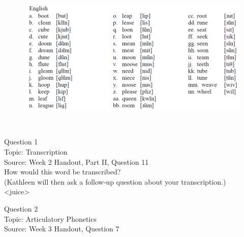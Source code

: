 \documentclass[12pt]{article}
\begin{document}
\begin{figure}[H]
\includegraphics{../images/english12.png}
\end{figure}

\newpage

\begin{center}
\textbf{{\color{red}{\HUGE END OF EXAM}}}\\

\end{center}
\newpage

\begin{center}
\textbf{{\color{blue}{\HUGE START OF EXAM\\}}}

\textbf{{\color{blue}{\HUGE Student ID: 34812\\}}}

\textbf{{\color{blue}{\HUGE \\}}}

\end{center}
\newpage

{\large Question 1}\\

Topic: Transcription\\
Source: Week 2 Handout, Part II, Question 11\\

How would this word be transcribed?\\ (Kathleen will then ask a follow-up question about your transcription.)\\

<juice>


\newpage

{\large Question 2}\\

Topic: Articulatory Phonetics\\
Source: Week 3 Handout, Question 7\\
\end{document}
